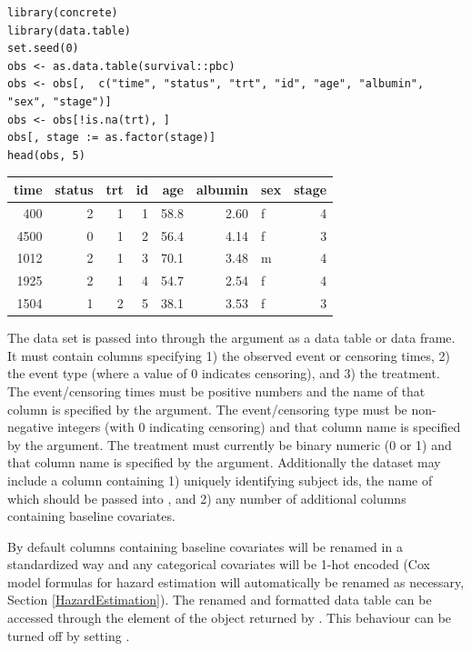 \documentclass{report}
\newcommand{\1}{\ensuremath{\mathbf{1}}}
\begin{document}
\begin{lstlisting}
library(concrete)
library(data.table)
set.seed(0)
obs <- as.data.table(survival::pbc)
obs <- obs[,  c("time", "status", "trt", "id", "age", "albumin", "sex", "stage")]
obs <- obs[!is.na(trt), ]
obs[, stage := as.factor(stage)]
head(obs, 5)
\end{lstlisting}

\begin{center}
\begin{tabular}{rrrrrrlr}
time & status & trt & id & age & albumin & sex & stage\\
\hline
400 & 2 & 1 & 1 & 58.8 & 2.60 & f & 4\\
4500 & 0 & 1 & 2 & 56.4 & 4.14 & f & 3\\
1012 & 2 & 1 & 3 & 70.1 & 3.48 & m & 4\\
1925 & 2 & 1 & 4 & 54.7 & 2.54 & f & 4\\
1504 & 1 & 2 & 5 & 38.1 & 3.53 & f & 3\\
\end{tabular}
\end{center}

The data set is passed into  through the argument as a data table or data frame. It must contain columns specifying 1) the observed event or censoring times, 2) the event type (where a value of 0 indicates censoring), and 3) the treatment. The event/censoring times must be positive numbers and the name of that column is specified by the  argument. The event/censoring type must be non-negative integers (with 0 indicating censoring) and that column name is specified by the  argument. The treatment must currently be binary numeric (0 or 1) and that column name is specified by the  argument. Additionally the dataset may include a column containing 1) uniquely identifying subject ids, the name of which should be passed into , and 2) any number of additional columns containing baseline covariates.

By default columns containing baseline covariates will be renamed in a standardized way and any categorical covariates will be 1-hot encoded (Cox model formulas for hazard estimation will automatically be renamed as necessary, Section \ref{HazardEstimation}). The renamed and formatted data table can be accessed through the  element of the  object returned by . This behaviour can be turned off by setting .
\end{document}

